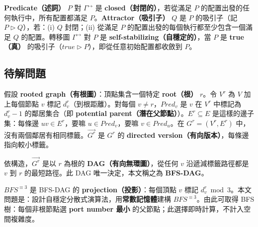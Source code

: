 \documentclass[a4paper, 12pt]{article}
\begin{document}
\textbf{Predicate（述詞）} $P$ 對 $\Gamma^{\mapsto}$ 是 \textbf{closed（封閉的）}，若從滿足 $P$ 的配置出發的任何執行中，所有配置都滿足 $P$。\textbf{Attractor（吸引子）} $Q$ 是 $P$ 的吸引子（記 $P\vartriangleright Q$），若：(i) $Q$ 封閉；(ii) 從滿足 $P$ 的配置出發的每個執行都至少包含一個滿足 $Q$ 的配置。轉移圖 $\Gamma^{\mapsto}$ 對 $P$ 是 \textbf{self-stabilizing（自穩定的）}，當 $P$ 是 \textbf{true（真）} 的吸引子（$\mathit{true}\vartriangleright P$），即從任意初始配置都收斂到 $P$。

\subsection{待解問題}
\label{subsec:prelim-problem}

假設 \textbf{rooted graph（有根圖）}：頂點集含一個特定 \textbf{root（根）} $r$。令 $V^r$ 為 $V$ 加上每個節點 $v$ 標記 $d^r_v$（到根距離）。對每個 $v\neq r$，\textbf{$Pred_v$} 是 $v$ 在 $V^r$ 中標記為 $d^r_v-1$ 的鄰居集合（即 \textbf{potential parent（潛在父節點）}）。$E^r\subseteq E$ 是這樣的邊子集：每條邊 $uv\in E^r$，要嘛 $u\in Pred_v$，要嘛 $v\in Pred_u$。在 $G^r=(V^r,E^r)$ 中，沒有兩個鄰居有相同標籤。$\overrightarrow{G^r}$ 是 $G^r$ 的 \textbf{directed version（有向版本）}，每條邊指向較小標籤。

依構造，$\overrightarrow{G^r}$ 是以 $r$ 為根的 \textbf{DAG（有向無環圖）}，從任何 $v$ 沿遞減標籤路徑都是 $v$ 到 $r$ 的最短路徑。此 DAG 唯一決定，本文稱之為 \textbf{BFS-DAG}。

\textbf{$BFS^{\equiv 3}$} 是 BFS-DAG 的 \textbf{projection（投影）}：每個頂點 $v$ 標記 $d^r_v\bmod 3$。本文問題是：設計自穩定分散式演算法，用\textbf{常數記憶體}建構 $BFS^{\equiv 3}$。由此可取得 BFS 樹：每個非根節點選 \textbf{port number 最小} 的父節點；此選擇即時計算，不計入空間複雜度。



\end{document}
